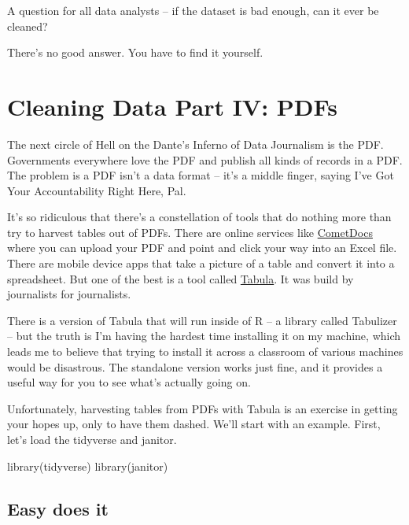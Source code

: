 \documentclass[
  letterpaper,
  DIV=11,
  numbers=noendperiod]{scrreprt}
\newenvironment{Shaded}{\begin{snugshade}}{\end{snugshade}}
\newcommand{\FunctionTok}[1]{\textcolor[rgb]{0.28,0.35,0.67}{#1}}
\newcommand{\NormalTok}[1]{\textcolor[rgb]{0.00,0.23,0.31}{#1}}
\begin{document}
A question for all data analysts -- if the dataset is bad enough, can it
ever be cleaned?

There's no good answer. You have to find it yourself.


\hypertarget{cleaning-data-part-iv-pdfs}{%
\chapter{Cleaning Data Part IV: PDFs}\label{cleaning-data-part-iv-pdfs}}

The next circle of Hell on the Dante's Inferno of Data Journalism is the
PDF. Governments everywhere love the PDF and publish all kinds of
records in a PDF. The problem is a PDF isn't a data format -- it's a
middle finger, saying I've Got Your Accountability Right Here, Pal.

It's so ridiculous that there's a constellation of tools that do nothing
more than try to harvest tables out of PDFs. There are online services
like \href{https://www.cometdocs.com/}{CometDocs} where you can upload
your PDF and point and click your way into an Excel file. There are
mobile device apps that take a picture of a table and convert it into a
spreadsheet. But one of the best is a tool called
\href{https://tabula.technology/}{Tabula}. It was build by journalists
for journalists.

There is a version of Tabula that will run inside of R -- a library
called Tabulizer -- but the truth is I'm having the hardest time
installing it on my machine, which leads me to believe that trying to
install it across a classroom of various machines would be disastrous.
The standalone version works just fine, and it provides a useful way for
you to see what's actually going on.

Unfortunately, harvesting tables from PDFs with Tabula is an exercise in
getting your hopes up, only to have them dashed. We'll start with an
example. First, let's load the tidyverse and janitor.

\begin{Shaded}
\begin{Highlighting}[]
\FunctionTok{library}\NormalTok{(tidyverse)}
\FunctionTok{library}\NormalTok{(janitor)}
\end{Highlighting}
\end{Shaded}

\hypertarget{easy-does-it}{%
\section{Easy does it}\label{easy-does-it}}
\end{document}
